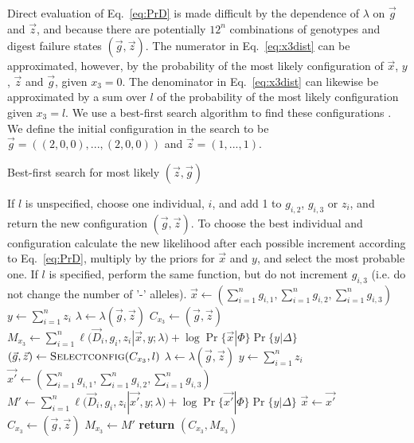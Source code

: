 \documentclass{article}
\begin{document}
Direct evaluation of Eq.~\eqref{eq:PrD} is made difficult by the dependence of $\lambda$ on $\vec{g}$ and $\vec{z}$, and because there are potentially $12^n$ combinations of genotypes and digest failure states $(\vec{g}, \vec{z})$. The numerator in Eq.~\eqref{eq:x3dist} can be approximated, however, by the probability of the most likely configuration of $\vec{x}$, $y$, $\vec{z}$ and $\vec{g}$, given $x_3 = 0$. The denominator in Eq.~\eqref{eq:x3dist} can likewise be approximated by a sum over $l$ of the probability of the most likely configuration given $x_3=l$. We use a best-first search algorithm to find these configurations \cite{gatkpaper}. We define the initial configuration in the search to be $\vec{g} = ((2, 0, 0), ..., (2, 0, 0))$ and $\vec{z} = (1, ..., 1)$.
\begin{algorithm}
\caption{Best-first search for most likely $(\vec{z}, \vec{g})$}
\begin{algorithmic}[1]
\begin{spacing}{1.2}
	\State If $l$ is unspecified, choose one individual, $i$, and add 1 to $g_{i,2}$, $g_{i,3}$ or $z_i$, and return the new configuration $(\vec{g}, \vec{z})$. To choose the best individual and configuration calculate the new likelihood after each possible increment according to Eq.~\eqref{eq:PrD}, multiply by the priors for $\vec{x}$ and $y$, and select the most probable one. If $l$ is specified, perform the same function, but do not increment $g_{i,3}$ (i.e. do not change the number of '-' alleles).
\EndFunction
{}
\State $\vec{x} \gets (\sum_{i=1}^{n} g_{i,1}, \sum_{i=1}^{n} g_{i,2}, \sum_{i=1}^{n} g_{i,3})$ 
\State $y \gets \sum_{i=1}^{n} z_i$ 
\State $\lambda \gets \lambda(\vec{g}, \vec{z})$ 
\State $C_{x_3} \gets (\vec{g}, \vec{z})$ 
\State $M_{x_3} \gets \sum_{i=1}^{n} \ell(\vec{D}_i, g_i, z_i | \vec{x}, y; \lambda) + \log\Pr\{\vec{x} | \Phi\} \Pr\{y | \Delta\}$ 
	\State $(\vec{g}, \vec{z}) \gets \Call{Selectconfig}{C_{x_3}, l}$
	\State $\lambda \gets \lambda(\vec{g}, \vec{z})$ 	
	\State $y \gets \sum_{i=1}^{n} z_i$
	\State $\vec{x'} \gets (\sum_{i=1}^{n} g_{i,1}, \sum_{i=1}^{n} g_{i,2}, \sum_{i=1}^{n} g_{i,3})$			
	\State $M' \gets \sum_{i=1}^{n} \ell(\vec{D}_i, g_i, z_i | \vec{x'}, y; \lambda) + \log\Pr\{\vec{x'} | \Phi\} \Pr\{y | \Delta\}$
		\State $\vec{x} \gets \vec{x'}$
		\State $C_{x_3} \gets (\vec{g}, \vec{z})$
		\State $M_{x_3} \gets M'$
	\Else
		\State \textbf{return} $(C_{x_3}, M_{x_3})$
	\EndIf
\EndWhile
\EndProcedure
\end{spacing}
\end{algorithmic}
\end{algorithm}
\end{document}
